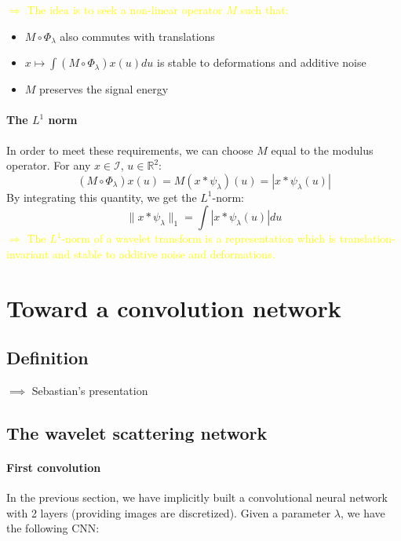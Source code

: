 \documentclass[10pt]{beamer}
\newcommand{\mathR}{\mathbb{R}}
\newcommand{\MI}{{\mathcal I}}
\newcommand{\col}{\textcolor{yellow}}
\begin{document}
\begin{darkframes}
\begin{frame}[label=non-lin1]{\subsecname}
    \vspace{6pt}
    \col{$\Rightarrow$ The idea is to seek a non-linear operator $M$ such that:}
    \begin{itemize}
        \item $M \circ \Phi_\lambda$ also commutes with translations
        \item $x \mapsto \int (M \circ \Phi_\lambda) x(u) du$ is stable to deformations and additive noise
        \item $M$ preserves the signal energy
    \end{itemize}
    \end{frame}
    
    \begin{frame}[label=non-lin2]{\subsecname}
    \framesubtitle{The $L^1$ norm}
    In order to meet these requirements, we can choose $M$ equal to the modulus operator. For any $x \in \MI$, $u \in \mathR^2$:
    $$(M \circ \Phi_\lambda) x(u) = M(x \ast \psi_\lambda)(u) = |x \ast \psi_\lambda(u)|$$
    By integrating this quantity, we get the $L^1$-norm:
    $$\|x \ast \psi_\lambda\|_1 = \int |x \ast \psi_\lambda(u)| du$$
    \col{$\Rightarrow$ The $L^1$-norm of a wavelet transform is a representation which is translation-invariant and stable to additive noise and deformations.}
    \end{frame}
    
    \section{Toward a convolution network}
    
    \subsection{Definition}

    \begin{frame}[label=def_conv]{\subsecname}
    $\implies$ Sebastian's presentation
    \end{frame}
    
    \subsection{The wavelet scattering network}
    
    \begin{frame}{\subsecname}
    \framesubtitle{First convolution}
    In the previous section, we have implicitly built a convolutional neural network with 2 layers (providing images are discretized). Given a parameter $\lambda$, we have the following CNN:
    \end{frame}
    

\end{darkframes}
\end{document}
